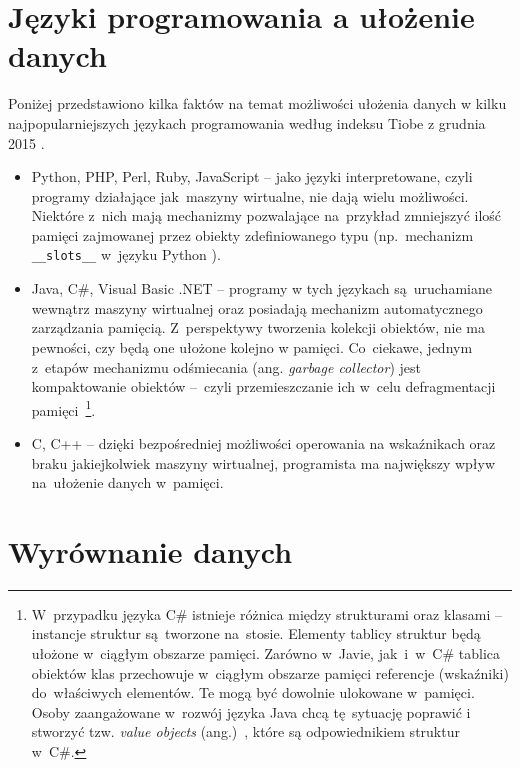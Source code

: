 \section{Języki programowania a ułożenie danych}
\label{cha:programming_langs}

Poniżej przedstawiono kilka faktów na temat możliwości ułożenia danych w kilku najpopularniejszych językach programowania według indeksu Tiobe z grudnia 2015 \cite{TiobeIndex}.

\begin{itemize}
	
	\item Python, PHP, Perl, Ruby, JavaScript -- jako języki interpretowane, czyli programy działające jak~maszyny wirtualne, nie dają wielu możliwości. Niektóre z~nich mają mechanizmy pozwalające na~przykład zmniejszyć ilość pamięci zajmowanej przez obiekty zdefiniowanego typu (np.~mechanizm \texttt{\_\_slots\_\_} w~języku Python \cite{PythonSlots}).
	
	\item Java, C\#, Visual Basic .NET -- programy w tych językach są~uruchamiane wewnątrz maszyny wirtualnej oraz posiadają mechanizm automatycznego zarządzania pamięcią. Z~perspektywy tworzenia kolekcji obiektów, nie ma pewności, czy będą one ułożone kolejno w pamięci. Co~ciekawe, jednym z~etapów mechanizmu odśmiecania (ang. \textit{garbage collector}) jest kompaktowanie obiektów --~czyli przemieszczanie ich w~celu defragmentacji pamięci~\cite{JavaCompacting, CSharpCompacting}\footnote{W~przypadku języka C\# istnieje różnica między strukturami oraz klasami -- instancje struktur są~tworzone na~stosie. Elementy tablicy struktur będą ułożone w~ciągłym obszarze pamięci. Zarówno w~Javie, jak~i~w~C\# tablica obiektów klas przechowuje w~ciągłym obszarze pamięci referencje (wskaźniki) do~właściwych elementów. Te mogą być dowolnie ulokowane w~pamięci. Osoby zaangażowane w~rozwój języka Java chcą tę~sytuację poprawić i stworzyć tzw. \textit{value objects} (ang.)~\cite{JavaValueObjects}, które są odpowiednikiem struktur w~C\#.}.
	
	\item C, C++ -- dzięki bezpośredniej możliwości operowania na wskaźnikach oraz braku jakiejkolwiek maszyny wirtualnej, programista ma największy wpływ na~ułożenie danych w~pamięci.

\end{itemize}

\section{Wyrównanie danych}
\label{cha:DataAlignment}

